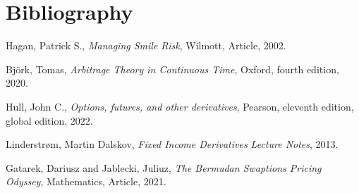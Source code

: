 \clearpage
{}
\section*{Bibliography}
\renewcommand{\refname}{} 

\begin{thebibliography}{25}
Hagan, Patrick S., \emph{Managing Smile Risk},
Wilmott, Article, 2002.

Björk, Tomas, \emph{Arbitrage Theory in Continuous Time},
Oxford, fourth edition, 2020.

Hull, John C., \emph{Options, futures, and other derivatives},
Pearson, eleventh edition, global edition, 2022.

Linderstrøm, Martin Dalskov, \emph{Fixed Income Derivatives Lecture Notes},
2013.


Gatarek, Dariusz and Jablecki, Juliuz, \emph{The Bermudan Swaptions Pricing Odyssey},
Mathematics, Article, 2021.
\end{thebibliography}


